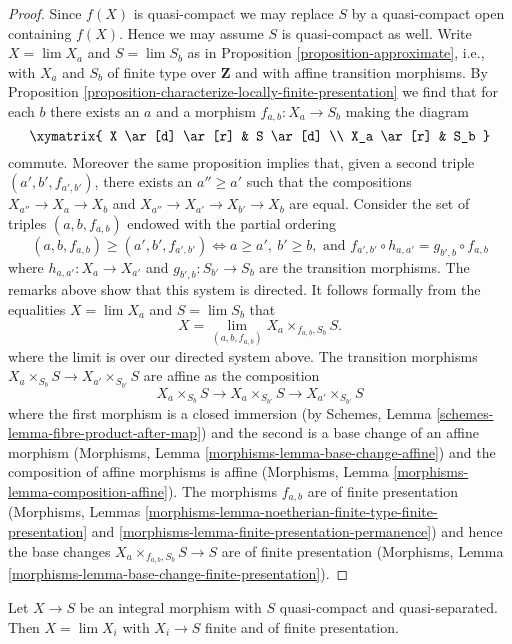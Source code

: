 \begin{proof}
Since $f(X)$ is quasi-compact we may replace $S$ by a quasi-compact
open containing $f(X)$. Hence we may assume $S$ is quasi-compact as well.
Write $X = \lim X_a$ and $S = \lim S_b$ as in
Proposition \ref{proposition-approximate}, i.e., with $X_a$ and $S_b$
of finite type over $\mathbf{Z}$ and with affine transition morphisms.
By Proposition \ref{proposition-characterize-locally-finite-presentation}
we find that for each $b$ there exists an $a$ and a morphism
$f_{a, b} : X_a \to S_b$ making the diagram
$$
\xymatrix{
X \ar[d] \ar[r] & S \ar[d] \\
X_a \ar[r] & S_b
}
$$
commute. Moreover the same proposition implies that, given a second
triple $(a', b', f_{a', b'})$, there exists an $a'' \geq a'$ such that
the compositions $X_{a''} \to X_a \to X_b$ and
$X_{a''} \to X_{a'} \to X_{b'} \to X_b$ are equal.
Consider the set of triples $(a, b, f_{a, b})$ endowed with the
partial ordering
$$
(a, b, f_{a, b}) \geq (a', b', f_{a', b'})
\Leftrightarrow
a \geq a',\ b' \geq b,\text{ and }
f_{a', b'} \circ h_{a, a'} = g_{b', b} \circ f_{a, b}
$$
where $h_{a, a'} : X_a \to X_{a'}$ and $g_{b', b} : S_{b'} \to S_b$
are the transition morphisms. The remarks above show that this system
is directed. It follows formally from the equalities
$X = \lim X_a$ and $S = \lim S_b$ that
$$
X = \lim_{(a, b, f_{a, b})} X_a \times_{f_{a, b}, S_b} S.
$$
where the limit is over our directed system above. The transition morphisms
$X_a \times_{S_b} S \to X_{a'} \times_{S_{b'}} S$ are affine as
the composition
$$
X_a \times_{S_b} S \to X_a \times_{S_{b'}} S \to X_{a'} \times_{S_{b'}} S
$$
where the first morphism is a closed immersion (by
Schemes, Lemma \ref{schemes-lemma-fibre-product-after-map})
and the second is a base change of an affine morphism
(Morphisms, Lemma \ref{morphisms-lemma-base-change-affine})
and the composition of affine morphisms is affine
(Morphisms, Lemma \ref{morphisms-lemma-composition-affine}).
The morphisms $f_{a, b}$ are of finite presentation
(Morphisms, Lemmas
\ref{morphisms-lemma-noetherian-finite-type-finite-presentation} and
\ref{morphisms-lemma-finite-presentation-permanence})
and hence the base changes $X_a \times_{f_{a, b}, S_b} S \to S$
are of finite presentation
(Morphisms, Lemma \ref{morphisms-lemma-base-change-finite-presentation}).
\end{proof}

\begin{lemma}
\label{lemma-integral-limit-finite-and-finite-presentation}
Let $X \to S$ be an integral morphism with $S$ quasi-compact and
quasi-separated. Then $X = \lim X_i$ with $X_i \to S$ finite and
of finite presentation.
\end{lemma}

